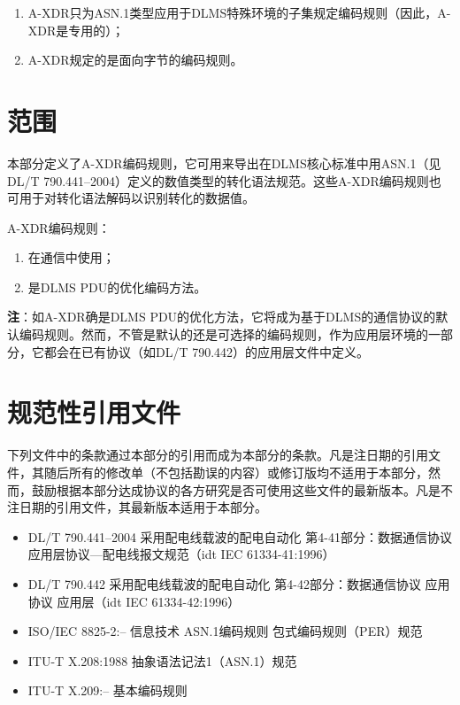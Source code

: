 \documentclass[a4paper,11pt]{ctexart}
\begin{document}
\begin{enumerate}[label=\alph*)]
\item A-XDR只为ASN.1类型应用于DLMS特殊环境的子集规定编码规则（因此，A-XDR是专用的）；
\item A-XDR规定的是面向字节的编码规则。
\end{enumerate}

\newpage

\tableofcontents
\newpage

\section{范围}

本部分定义了A-XDR编码规则，它可用来导出在DLMS核心标准中用ASN.1（见DL/T 790.441--2004）定义的数值类型的转化语法规范。这些A-XDR编码规则也可用于对转化语法解码以识别转化的数据值。

A-XDR编码规则：
\begin{enumerate}[label=\alph*)]
\item 在通信中使用；
\item 是DLMS PDU的优化编码方法。
\end{enumerate}

\noindent\textbf{注}：如A-XDR确是DLMS PDU的优化方法，它将成为基于DLMS的通信协议的默认编码规则。然而，不管是默认的还是可选择的编码规则，作为应用层环境的一部分，它都会在已有协议（如DL/T 790.442）的应用层文件中定义。

\section{规范性引用文件}

下列文件中的条款通过本部分的引用而成为本部分的条款。凡是注日期的引用文件，其随后所有的修改单（不包括勘误的内容）或修订版均不适用于本部分，然而，鼓励根据本部分达成协议的各方研究是否可使用这些文件的最新版本。凡是不注日期的引用文件，其最新版本适用于本部分。

\begin{itemize}[leftmargin=2em]
\item DL/T 790.441--2004 采用配电线载波的配电自动化 第4-41部分：数据通信协议 应用层协议---配电线报文规范（idt IEC 61334-41:1996）
\item DL/T 790.442 采用配电线载波的配电自动化 第4-42部分：数据通信协议 应用协议 应用层（idt IEC 61334-42:1996）
\item ISO/IEC 8825-2:-- 信息技术 ASN.1编码规则 包式编码规则（PER）规范
\item ITU-T X.208:1988 抽象语法记法1（ASN.1）规范
\item ITU-T X.209:-- 基本编码规则
\end{itemize}
\end{document}
